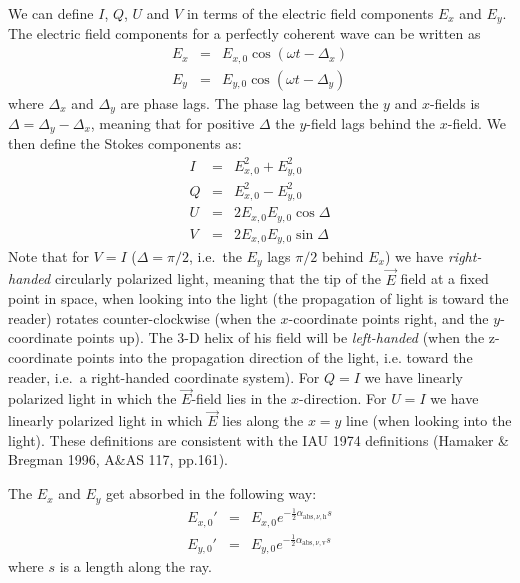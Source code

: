 \documentclass{report}
\begin{document}
We can define $I$, $Q$, $U$ and $V$ in terms of the electric field
components $E_x$ and $E_y$. The electric field components for a perfectly
coherent wave can be written as
\begin{eqnarray}
E_x&=&E_{x,0}\cos(\omega t-\Delta_x)\\
E_y&=&E_{y,0}\cos(\omega t-\Delta_y)
\end{eqnarray}
where $\Delta_x$ and $\Delta_y$ are phase lags. The phase lag between
the $y$ and $x$-fields is $\Delta=\Delta_y-\Delta_x$, meaning that for
positive $\Delta$ the $y$-field lags behind the $x$-field. We then 
define the Stokes components as:
\begin{eqnarray}
I &=& E_{x,0}^2+E_{y,0}^2\label{eq-def-stokes-i}\\
Q &=& E_{x,0}^2-E_{y,0}^2\label{eq-def-stokes-q}\\
U &=& 2E_{x,0}E_{y,0}\cos\Delta\label{eq-def-stokes-u}\\
V &=& 2E_{x,0}E_{y,0}\sin\Delta\label{eq-def-stokes-v}
\end{eqnarray}
Note that for $V=I$ ($\Delta=\pi/2$, i.e.\ the $E_y$ lags $\pi/2$ behind
$E_x$) we have {\em right-handed} circularly polarized light, meaning that
the tip of the $\vec E$ field at a fixed point in space, when looking into
the light (the propagation of light is toward the reader) rotates
counter-clockwise (when the $x$-coordinate points right, and the
$y$-coordinate points up). The 3-D helix of his field will be {\em
  left-handed} (when the z-coordinate points into the propagation direction
of the light, i.e. toward the reader, i.e.\ a right-handed coordinate
system). For $Q=I$ we have linearly polarized light in which the $\vec
E$-field lies in the $x$-direction. For $U=I$ we have linearly polarized
light in which $\vec E$ lies along the $x=y$ line (when looking into the
light). These definitions are consistent with the IAU 1974 definitions
(Hamaker \& Bregman 1996, A\&AS 117, pp.161).

The $E_x$ and $E_y$ get absorbed in the following way:
\begin{eqnarray}
E_{x,0}' &=& E_{x,0} e^{-\tfrac{1}{2}\alpha_{\mathrm{abs},\nu,\mathrm{h}}s}\\
E_{y,0}' &=& E_{y,0} e^{-\tfrac{1}{2}\alpha_{\mathrm{abs},\nu,\mathrm{v}}s}
\end{eqnarray}
where $s$ is a length along the ray.
\end{document}
